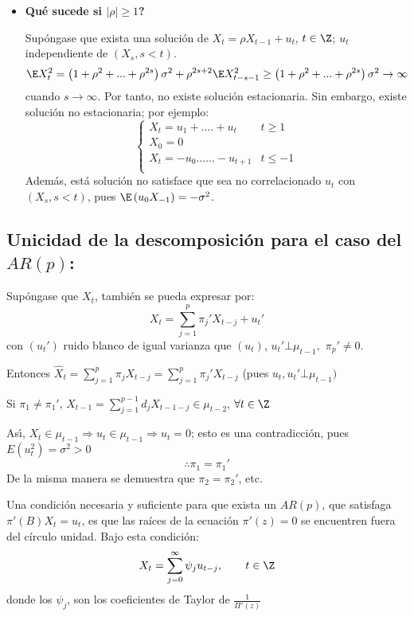 \begin{itemize}
\item \textbf{Qu\'{e} sucede si $\left| \rho \right|\ge 1$?}

	Sup\'{o}ngase que exista una soluci\'{o}n de $X_{t} =\rho X_{t-1} +u_{t} $, $t\in \Z$; $u_{t} $ independiente de $\left( {X_{s} ,s<t} \right)$.
	\[
	 \E X_{t}^{2} =\left( {1+\rho^{2}+...+\rho^{2s}} \right)\sigma^{2}+\rho ^{2s+2}\E X_{t-s-1}^{2} \ge \left( {1+\rho^{2}+...+\rho^{2s}} \right)\sigma^{2}\to \infty
	\]
	cuando $s\to \infty $. Por tanto, no existe soluci\'{o}n estacionaria. Sin embargo, existe soluci\'{o}n no estacionaria; por ejemplo:
	\[
		\begin{cases}
			 X_{t} =u_{1} +....+u_{t} & t\ge 1 \\ 
			 X_{0} =0 \\ 
			 X_{t} =-u_{0} ......-u_{t+1} & t\le -1 \\ 
		\end{cases}
	\]
	Adem\'{a}s, est\'{a} soluci\'{o}n no satisface que sea no correlacionado $u_{t} $ con $(X_{s}, s<t)$, pues $\E\left( {u_{0} X_{-1} } \right)=-\sigma^{2}$.
\end{itemize}

\subsection{Unicidad de la descomposici\'{o}n para el caso del $AR(p)$:}

Sup\'{o}ngase que $X_{t}$, tambi\'{e}n se pueda expresar por:
\[
X_{t} =\sum_{j=1}^p {\pi_{j}' X_{t-j} +u_{t}' } 
\]
con $(u_{t}' )$ ruido blanco de igual varianza que $(u_{t} )$, $u_{t}' \bot \mu_{t-1},$ $\pi_{p}' \ne 0$.\newline 

Entonces $\widehat{{X}}_{t} =\sum_{j=1}^p {\pi_{j} X_{t-j} } =\sum_{j=1}^p {\pi_{j}' X_{t-j} } $ (pues $u_{t} ,u_{t}' \bot \mu_{t-1} )$\newline

Si $\pi_{1} \ne \pi_{1}'$, $X_{t-1} =\sum_{j=1}^{p-1} {d_{j} X_{t-1-j} \in \mu_{t-2} }$, $\forall t\in \Z$\newline

As\'{\i}, $X_{t} \in \mu_{t-1} \Rightarrow u_{t} \in \mu_{t-1} \Rightarrow u_{t} =0$; esto es una contradicci\'{o}n, pues $E\left( {u_{t}^{2} } \right)=\sigma^{2}>0$ 
\[
\therefore\pi_{1} =\pi_{1}' 
\]
De la misma manera se demuestra que $\pi_{2} =\pi_{2}'$, etc.

\begin{teorema}
Una condici\'{o}n necesaria y suficiente para que exista un $AR(p)$, que satisfaga $\pi'( B)X_{t} =u_{t} $, es que las ra\'{i}ces de la ecuaci\'{o}n $\pi'( z )=0$ se encuentren fuera del c\'{i}rculo unidad. Bajo esta condici\'{o}n:
\[
X_{t} =\sum_{j=0}^\infty {\psi_{j} u_{t-j} } ,
\qquad
t\in \Z
\]
donde los $\psi_{j} $, son los coeficientes de Taylor de $\frac{1}{\Pi'\left( z \right)}$
\end{teorema}

